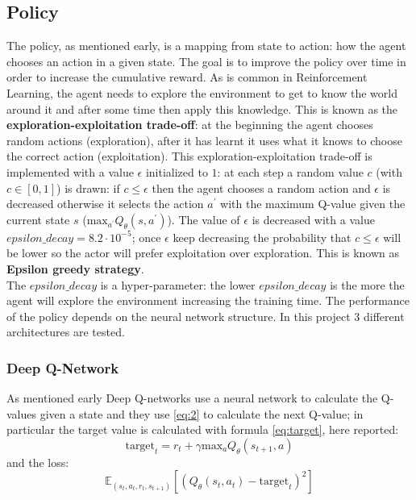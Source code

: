 \documentclass[14pt]{extarticle}
\def\sp{\vspace{5pt}}
\def\pp{\vspace{10pt}\newline}
\begin{document}
\begin{flushleft}
	
	\subsection{Policy}
	\sp
	The policy, as mentioned early, is a mapping from state to action: how the agent chooses an action in a given state. The goal is to improve the policy over time in order to increase the cumulative reward. 
	\pp	
	As is common in Reinforcement Learning, the agent needs to explore the environment to get to know the world around it and after some time then apply this knowledge.  This is known as the \textbf{exploration-exploitation trade-off}: at the beginning the agent chooses random actions (exploration), after it has learnt it uses what it knows to choose the correct action (exploitation). \pp
	This exploration-exploitation trade-off is implemented with a value $\epsilon$ initialized to $1$: at each step a random value $c$ (with $c \in [0,1]$) is drawn: if $c\leq\epsilon$ then the agent chooses a random action and $\epsilon$ is decreased otherwise it selects the action $a^\prime$ with the maximum Q-value given the current state $s$ ($\text{max}_{a^\prime}Q_{\theta}(s,a^\prime)$).
	\pp
	The value of $\epsilon$ is decreased with a value $epsilon\_decay = 8.2 \cdot 10^{-5}$; once $\epsilon$ keep decreasing the probability that $c\leq\epsilon$ will be lower so the actor will prefer exploitation over exploration. This is known as \textbf{Epsilon greedy strategy}.\\
	The $epsilon\_decay$ is a hyper-parameter: the lower $epsilon\_decay$ is the more the agent will explore the environment increasing the training time. 
	\pp
	The performance of the policy depends on the neural network structure. In this project 3 different architectures are tested. %
	
	\subsubsection{Deep Q-Network}
	\sp
	As mentioned early Deep Q-networks use a neural network to calculate the Q-values given a state and they use \ref{eq:2} to calculate the next Q-value; in particular the target value is calculated with formula \ref{eq:target}, here reported:
	\[
\text{target}_t = r_t + \gamma\text{max}_{a}Q_{\theta}(s_{t+1},a)
\]
and the loss:
\[\mathbb{E}_{(s_t,a_t,r_t,s_{t+1})}[(Q_{\theta}(s_t,a_t) - \text{target}_t)^2]\] 


\end{flushleft}
\end{document}
